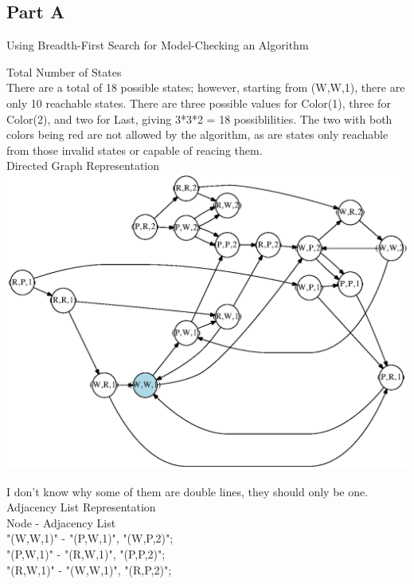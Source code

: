 \documentclass[12pt,twoside]{article}
\begin{document}
\begin{problems}

\section*{Part A}
\problem Using Breadth-First Search for Model-Checking an Algorithm
\begin{problemparts}
\problempart Total Number of States\\

There are a total of 18 possible states; however, starting from (W,W,1), there are only 10 reachable states.  There are three possible values for Color(1), three for Color(2), and two for Last, giving 3*3*2 = 18 possiblilities.  The two with both colors being red are not allowed by the algorithm, as are states only reachable from those invalid states or capable of reacing them.\\


\problempart Directed Graph Representation\\

\includegraphics{test.eps}

I don't know why some of them are double lines, they should only be one.
\problempart Adjacency List Representation\\
	Node      -  Adjacency List\\
        "(W,W,1)" - "(P,W,1)", "(W,P,2)";\\

        "(P,W,1)" - "(R,W,1)", "(P,P,2)";\\

        "(R,W,1)" - "(W,W,1)", "(R,P,2)";\\


\end{problemparts}
\end{problems}
\end{document}
